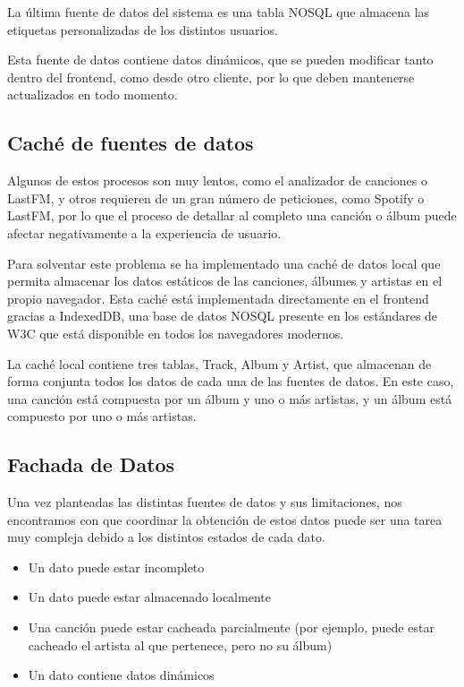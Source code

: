 La última fuente de datos del sistema es una tabla NOSQL que almacena
las etiquetas personalizadas de los distintos usuarios.

Esta fuente de datos contiene datos dinámicos, que se pueden modificar
tanto dentro del frontend, como desde otro cliente, por lo que deben
mantenerse actualizados en todo momento.


\subsection{Caché de fuentes de
datos}\label{cachuxe9-de-fuentes-de-datos}

Algunos de estos procesos son muy lentos, como el analizador de
canciones o LastFM, y otros requieren de un gran número de peticiones,
como Spotify o LastFM, por lo que el proceso de detallar al completo una
canción o álbum puede afectar negativamente a la experiencia de usuario.

Para solventar este problema se ha implementado una caché de datos local que
permita almacenar los datos estáticos de las canciones, álbumes y
artistas en el propio navegador.
Esta caché está implementada directamente en el frontend gracias a
IndexedDB, una base de datos NOSQL presente en los estándares de W3C que
está disponible en todos los navegadores modernos.

La caché local contiene tres tablas, Track, Album y Artist, que almacenan de
forma conjunta todos los datos de cada una de las fuentes de datos.
En este caso, una canción está compuesta por un álbum y uno o más
artistas, y un álbum está compuesto por uno o más artistas.


\subsection{Fachada de Datos}\label{fachada-de-datos}

Una vez planteadas las distintas fuentes de datos y sus limitaciones,
nos encontramos con que coordinar la obtención de estos datos puede ser
una tarea muy compleja debido a los distintos estados de cada dato.

\begin{itemize}
\itemsep0em
\item
  Un dato puede estar incompleto
\item
  Un dato puede estar almacenado localmente
\item
  Una canción puede estar cacheada parcialmente (por ejemplo, puede
  estar cacheado el artista al que pertenece, pero no su álbum)
\item
  Un dato contiene datos dinámicos
\end{itemize}

